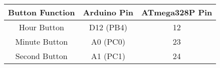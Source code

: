 \begin{table}[h]
    \centering
    \begin{tabular}{|c|c|c|}
        \hline
        \textbf{Button Function} & \textbf{Arduino Pin} & \textbf{ATmega328P Pin} \\
        \hline
        Hour Button   & D12 (PB4)  & 12  \\
        Minute Button & A0 (PC0)   & 23  \\
        Second Button & A1 (PC1)   & 24  \\
        \hline
    \end{tabular}
    \label{tab:button_pins}
\end{table}


